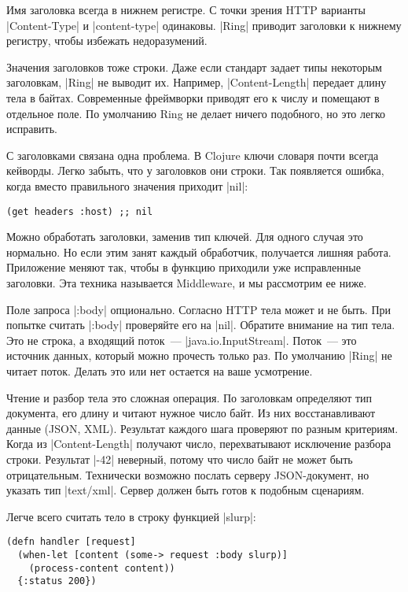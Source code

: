 Имя заголовка всегда в нижнем регистре. С точки зрения HTTP варианты
\spverb|Content-Type| и \spverb|content-type| одинаковы. \spverb|Ring| приводит заголовки к
нижнему регистру, чтобы избежать недоразумений.

Значения заголовков тоже строки. Даже если стандарт задает типы некоторым
заголовкам, \spverb|Ring| не выводит их. Например,  \spverb|Content-Length|
передает длину тела в байтах. Современные фреймворки
приводят его к числу и помещают в отдельное поле. По умолчанию Ring не делает
ничего подобного, но это легко исправить.

С заголовками связана одна проблема. В Clojure ключи словаря почти всегда
кейворды. Легко забыть, что у заголовков они строки. Так появляется ошибка,
когда вместо правильного значения приходит \spverb|nil|:

\begin{verbatim}
(get headers :host) ;; nil
\end{verbatim}

Можно обработать заголовки, заменив тип ключей. Для одного случая это
нормально. Но если этим занят каждый обработчик, получается лишняя
работа. Приложение меняют так, чтобы в функцию приходили уже исправленные
заголовки. Эта техника называется Middleware, и мы рассмотрим ее ниже.

Поле запроса \spverb|:body| опционально. Согласно HTTP тела может и не быть. При
попытке считать \spverb|:body| проверяйте его на \spverb|nil|. Обратите внимание
на тип тела. Это не строка, а входящий поток~---
\spverb|java.io.InputStream|. Поток~--- это источник данных, который можно
прочесть только раз. По умолчанию \spverb|Ring| не читает поток. Делать это или нет
остается на ваше усмотрение.

Чтение и разбор тела это сложная операция. По заголовкам
определяют тип документа, его длину и читают нужное число байт. Из них
восстанавливают данные (JSON, XML). Результат каждого шага проверяют по разным
критериям. Когда из \spverb|Content-Length| получают число, перехватывают
исключение разбора строки. Результат \spverb|-42| неверный, потому что число байт не
может быть отрицательным. Технически возможно послать серверу JSON-документ, но
указать тип \spverb|text/xml|. Сервер должен быть готов к подобным сценариям.

Легче всего считать тело в строку функцией \spverb|slurp|:

\begin{verbatim}
(defn handler [request]
  (when-let [content (some-> request :body slurp)]
    (process-content content))
  {:status 200})
\end{verbatim}

